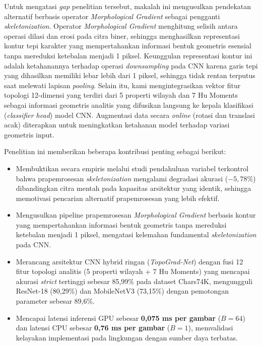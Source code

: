 \documentclass[journal]{IEEEtran}
\begin{document}
Untuk mengatasi \textit{gap} penelitian tersebut, makalah ini mengusulkan pendekatan alternatif berbasis operator \textit{Morphological Gradient} sebagai pengganti \textit{skeletonization}. Operator \textit{Morphological Gradient} \cite{soille2004morphological} menghitung selisih antara operasi dilasi dan erosi pada citra biner, sehingga menghasilkan representasi kontur tepi karakter yang mempertahankan informasi bentuk geometris esensial tanpa mereduksi ketebalan menjadi 1 piksel. Keunggulan representasi kontur ini adalah ketahanannya terhadap operasi \textit{downsampling} pada CNN karena garis tepi yang dihasilkan memiliki lebar lebih dari 1 piksel, sehingga tidak rentan terputus saat melewati lapisan \textit{pooling}. Selain itu, kami mengintegrasikan vektor fitur topologi 12-dimensi yang terdiri dari 5 properti wilayah dan 7 Hu Moments \cite{hu1962visual} sebagai informasi geometris analitis yang difusikan langsung ke kepala klasifikasi (\textit{classifier head}) model CNN. Augmentasi data secara \textit{online} (rotasi dan translasi acak) diterapkan untuk meningkatkan ketahanan model terhadap variasi geometris input.

Penelitian ini memberikan beberapa kontribusi penting sebagai berikut:
\begin{itemize}
    \item Membuktikan secara empiris melalui studi pendahuluan variabel terkontrol bahwa prapemrosesan \textit{skeletonization} mengalami degradasi akurasi ($-5{,}78\%$) dibandingkan citra mentah pada kapasitas arsitektur yang identik, sehingga memotivasi pencarian alternatif prapemrosesan yang lebih efektif.
    \item Mengusulkan pipeline prapemrosesan \textit{Morphological Gradient} berbasis kontur yang mempertahankan informasi bentuk geometris tanpa mereduksi ketebalan menjadi 1 piksel, mengatasi kelemahan fundamental \textit{skeletonization} pada CNN.
    \item Merancang arsitektur CNN hybrid ringan (\textit{TopoGrad-Net}) dengan fusi 12 fitur topologi analitis (5 properti wilayah + 7 Hu Moments) yang mencapai akurasi \textit{strict} tertinggi sebesar 85,99\% pada dataset Chars74K, mengungguli ResNet-18 \cite{he2016deep} (80,29\%) dan MobileNetV3 \cite{howard2019searching} (73,15\%) dengan pemotongan parameter sebesar 89,6\%.
    \item Mencapai latensi inferensi GPU sebesar \textbf{0,075 ms per gambar} ($B=64$) dan latensi CPU sebesar \textbf{0,76 ms per gambar} ($B=1$), memvalidasi kelayakan implementasi pada lingkungan dengan sumber daya terbatas.
\end{itemize}
\end{document}
